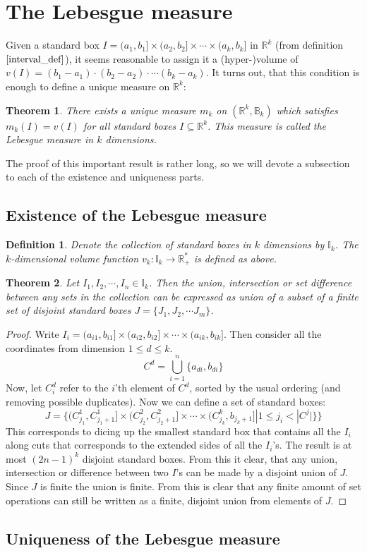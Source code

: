 \documentclass[12pt, a4paper]{article}
\newtheorem{theorem}{Theorem}[section]
\newtheorem{definition}{Definition}[section]
\numberwithin{equation}{section}
\begin{document}
\section{The Lebesgue measure}
Given a standard box $I=(a_1,b_1]\times(a_2,b_2]\times\cdots\times(a_k,b_k]$ in $\mathbb{R}^k$ (from definition $\ref{interval_def}$), it seems reasonable to assign it a (hyper-)volume of $v(I)=(b_1-a_1)\cdot(b_2-a_2)\cdot\cdots(b_k-a_k)$. It turns out, that this condition is enough to define a unique measure on $\mathbb{R}^k$:

\begin{theorem}
There exists a unique measure $m_k$ on $(\mathbb{R}^k,\mathbb{B}_k)$ which satisfies $m_k(I)=v(I)$ for all standard boxes $I\subseteq\mathbb{R}^k$. This measure is called the Lebesgue measure in $k$ dimensions.
\end{theorem}

The proof of this important result is rather long, so we will devote a subsection to each of the existence and uniqueness parts.

\subsection{Existence of the Lebesgue measure}
\begin{definition}
Denote the collection of standard boxes in $k$ dimensions by $\mathbb{I}_k$. The $k$-dimensional volume function $v_k: \mathbb{I}_k\rightarrow\mathbb{R}^*_+$ is defined as above.
\end{definition}

\begin{theorem}
Let $I_1, I_2,\cdots, I_n\in\mathbb{I}_k$. Then the union, intersection or set difference between any sets in the collection can be expressed as union of a subset of a finite set of disjoint standard boxes $J=\{J_1,J_2,\cdots J_m\}$.
\end{theorem}
\begin{proof}
Write $I_i=(a_{i1},b_{i1}]\times(a_{i2},b_{i2}]\times\cdots\times(a_{ik},b_{ik}]$. Then consider all the coordinates from dimension $1\le d\le k$.
\begin{equation}
C^d=\bigcup_{i=1}^n\{a_{di},b_{di}\}
\end{equation}
Now, let $C^d_i$ refer to the $i$'th element of $C^d$, sorted by the usual ordering (and removing possible duplicates). Now we can define a set of standard boxes:
\begin{equation}
J=\{(C^1_{j_1},C^1_{j_1+1}]\times(C^2_{j_2},C^2_{j_2+1}]\times\cdots\times(C^k_{j_k},b_{j_k+1}]|1\le j_i<|C^j|\}\}
\end{equation}
This corresponds to dicing up the smallest standard box that contains all the $I_i$ along cuts that corresponds to the extended sides of all the $I_i$'s. The result is at most $(2n-1)^k$ disjoint standard boxes. From this it clear, that any union, intersection or difference between two $I$'s can be made by a disjoint union of $J$. Since $J$ is finite the union is finite. From this is clear that any finite amount of set operations can still be written as a finite, disjoint union from elements of $J$.
\end{proof}

\subsection{Uniqueness of the Lebesgue measure}
\end{document}

